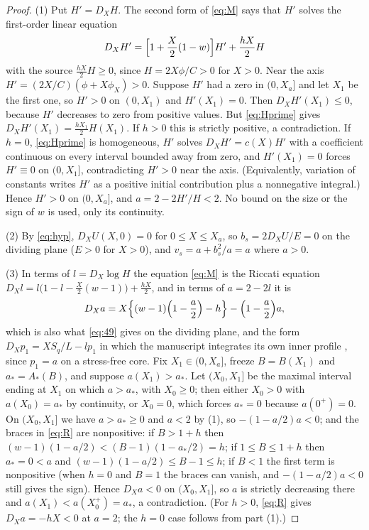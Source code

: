 \documentclass[11pt]{article}
\newcommand{\DX}{D_X}
\newcommand{\bs}{b_s}
\newcommand{\vs}{v_s}
\newcommand{\Sq}{S_q}
\begin{document}
\begin{proof}
(1) Put $H'=\DX H$. The second form of \eqref{eq:M} says that $H'$ solves the first-order linear equation
\begin{equation}\label{eq:Hprime}
\DX H'=\Bigl[1+\frac X2(1-w)\Bigr]H'+\frac{hX}{2}H
\end{equation}
with the source $\frac{hX}{2}H\ge0$, since $H=2X\phi/C>0$ for $X>0$. Near the axis $H'=(2X/C)(\phi+X\phi_X)>0$. Suppose $H'$ had a zero in $(0,X_a]$ and let $X_1$ be the first one, so $H'>0$ on $(0,X_1)$ and $H'(X_1)=0$. Then $\DX H'(X_1)\le0$, because $H'$ decreases to zero from positive values. But \eqref{eq:Hprime} gives $\DX H'(X_1)=\frac{hX_1}{2}H(X_1)$. If $h>0$ this is strictly positive, a contradiction. If $h=0$, \eqref{eq:Hprime} is homogeneous, $H'$ solves $\DX H'=c(X)H'$ with a coefficient continuous on every interval bounded away from zero, and $H'(X_1)=0$ forces $H'\equiv0$ on $(0,X_1]$, contradicting $H'>0$ near the axis. (Equivalently, variation of constants writes $H'$ as a positive initial contribution plus a nonnegative integral.) Hence $H'>0$ on $(0,X_a]$, and $a=2-2H'/H<2$. No bound on the size or the sign of $w$ is used, only its continuity.

(2) By \eqref{eq:hyp}, $\DX U(X,0)=0$ for $0\le X\le X_a$, so $\bs=2\DX U/E=0$ on the dividing plane ($E>0$ for $X>0$), and $\vs=a+\bs^2/a=a$ where $a>0$.

(3) In terms of $l=\DX\log H$ the equation \eqref{eq:M} is the Riccati equation $\DX l=l\bigl(1-l-\frac X2(w-1)\bigr)+\frac{hX}{2}$, and in terms of $a=2-2l$ it is
\begin{equation}\label{eq:R}
\DX a=X\Bigl\{(w-1)\Bigl(1-\frac a2\Bigr)-h\Bigr\}-\Bigl(1-\frac a2\Bigr)a ,
\end{equation}
which is also what \eqref{eq:49} gives on the dividing plane, and the form $\DX p_1=X\Sq/L-lp_1$ in which the manuscript integrates its own inner profile \cite[(B.25), p.~151]{OpenAINS}, since $p_1=a$ on a stress-free core. Fix $X_1\in(0,X_a]$, freeze $B=B(X_1)$ and $a_*=A_*(B)$, and suppose $a(X_1)>a_*$. Let $(X_0,X_1]$ be the maximal interval ending at $X_1$ on which $a>a_*$, with $X_0\ge0$; then either $X_0>0$ with $a(X_0)=a_*$ by continuity, or $X_0=0$, which forces $a_*=0$ because $a(0^+)=0$. On $(X_0,X_1]$ we have $a>a_*\ge0$ and $a<2$ by (1), so $-(1-a/2)a<0$; and the braces in \eqref{eq:R} are nonpositive: if $B>1+h$ then $(w-1)(1-a/2)<(B-1)(1-a_*/2)=h$; if $1\le B\le1+h$ then $a_*=0<a$ and $(w-1)(1-a/2)\le B-1\le h$; if $B<1$ the first term is nonpositive (when $h=0$ and $B=1$ the braces can vanish, and $-(1-a/2)a<0$ still gives the sign). Hence $\DX a<0$ on $(X_0,X_1]$, so $a$ is strictly decreasing there and $a(X_1)<a(X_0^+)=a_*$, a contradiction. (For $h>0$, \eqref{eq:R} gives $\DX a=-hX<0$ at $a=2$; the $h=0$ case follows from part (1).)


\end{proof}
\end{document}
